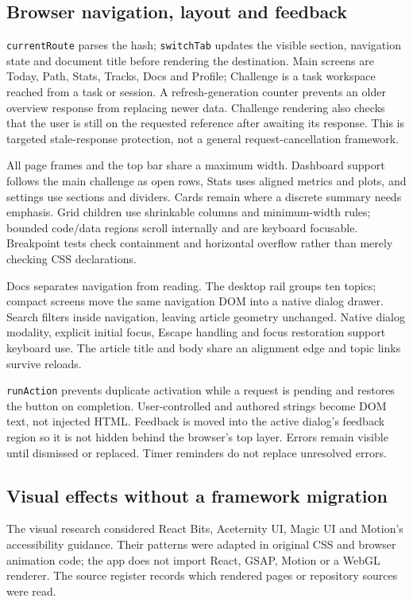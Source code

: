 \subsection{Browser navigation, layout and feedback}
\texttt{currentRoute} parses the hash; \texttt{switchTab} updates the visible section,
navigation state and document title before rendering the destination. Main screens
are Today, Path, Stats, Tracks, Docs and Profile; Challenge is a task workspace reached
from a task or session. A refresh-generation counter prevents an older overview
response from replacing newer data. Challenge rendering also checks that the user
is still on the requested reference after awaiting its response. This is targeted
stale-response protection, not a general request-cancellation framework.

All page frames and the top bar share a maximum width. Dashboard support follows
the main challenge as open rows, Stats uses aligned metrics and plots, and settings
use sections and dividers. Cards remain where a discrete summary needs emphasis.
Grid children use shrinkable columns and minimum-width rules; bounded code/data
regions scroll internally and are keyboard focusable. Breakpoint tests check
containment and horizontal overflow rather than merely checking CSS declarations.

Docs separates navigation from reading. The desktop rail groups ten topics; compact
screens move the same navigation DOM into a native dialog drawer. Search filters
inside navigation, leaving article geometry unchanged. Native dialog modality,
explicit initial focus, Escape handling and focus restoration support keyboard use.
The article title and body share an alignment edge and topic links survive reloads.

\texttt{runAction} prevents duplicate activation while a request is pending and
restores the button on completion. User-controlled and authored strings become
DOM text, not injected HTML. Feedback is moved into the active dialog's feedback
region so it is not hidden behind the browser's top layer. Errors remain visible
until dismissed or replaced. Timer reminders do not replace unresolved errors.

\subsection{Visual effects without a framework migration}
The visual research considered React Bits, Aceternity UI, Magic UI and Motion's
accessibility guidance. Their patterns were adapted in original CSS and browser
animation code; the app does not import React, GSAP, Motion or a WebGL renderer.
The source register records which rendered pages or repository sources were read.

